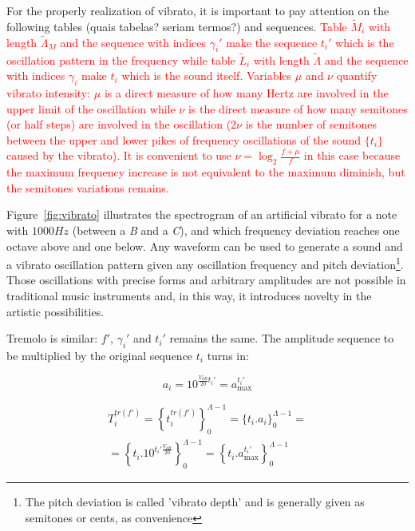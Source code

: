 \documentclass[
 aip,
 jmp,
 amsmath,amssymb,
 reprint,
]{revtex4-1}
\begin{document}
For the properly realization of vibrato, it is important to pay attention on the following tables (quais tabelas? seriam termos?) and sequences.
\textcolor{red}{Table $\widetilde{M}_i$ with length $\widetilde{\Lambda}_M$ and the sequence with indices $\gamma_i'$ make the sequence $t_i'$ which is the oscillation pattern in the frequency while table $\widetilde{L}_i$ with length $\widetilde{\Lambda}$ and the sequence with indices $\gamma_i$ make $t_i$ which is the sound itself.
Variables $\mu$ and $\nu$ quantify vibrato intensity: $\mu$ is a direct measure of how many Hertz are involved in the upper limit of the oscillation while $\nu$ is the direct measure of how many semitones (or half steps) are involved in the oscillation ($2\nu$ is the number of semitones between the upper and lower pikes of frequency oscillations of the sound $\{t_i\}$ caused by the vibrato).
It is convenient to use $\nu=\log_{2}\frac{f+\mu}{f} $ in this case because the maximum frequency increase is not equivalent to the maximum diminish, but the semitones variations remains.}

Figure~\ref{fig:vibrato} illustrates the spectrogram of an artificial vibrato for a note with $1000Hz$ (between a \emph{B} and a \emph{C}), and which frequency deviation reaches one octave above and one below. Any waveform can be used to generate a sound and a vibrato oscillation pattern given any oscillation frequency and pitch deviation\footnote{The pitch deviation is called 'vibrato depth' and is generally given as semitones or cents, as convenience}.
Those oscillations with precise forms and arbitrary amplitudes are not possible in traditional music instruments and, in this way, it introduces novelty in the artistic possibilities.

Tremolo is similar: $f'$, $\gamma_i'$ and $t_i'$ remains the same.
The amplitude sequence to be multiplied by the original sequence $t_i$ turns in:

\begin{equation}\label{trA}
 a_i=10^{\frac{V_{dB}}{20}t_i' } = a_{\text{max}}^{t_i'}
\end{equation}

\begin{multline}\label{trT}
 T_i^{tr(f')}=\left \{ t_i^{tr(f')} \right \}_0^{\Lambda-1}=\{ t_i . a_i \}_0^{\Lambda-1}= \\ =\left \{t_i .10^{t_i' \frac{V_{dB}}{20}}    \right \}_0^{\Lambda-1}=\left\{t_i . a_{\text{max}}^{t_i'} \right\}_0^{\Lambda-1}
\end{multline}
\end{document}
